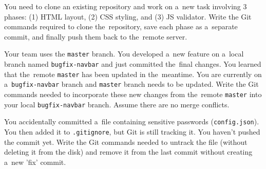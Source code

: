 \documentclass[11pt,a4paper,addpoints]{exam}
\begin{document}
\cellwidth{2.75cm}
\noindent \gradetable[h]

\vspace{0.8cm}

\begin{questions}

\question[2] 
You need to clone an existing repository and work on a~new task involving 3 phases: (1) HTML layout, (2) CSS styling, and (3) JS validator. Write the Git commands required to clone the~repository, save each phase as a~separate commit, and finally push them back to the~remote server.
\fillwithdottedlines{6cm}

\question[2] 
Your team uses the \texttt{master} branch. You developed a~new feature on a~local branch named \texttt{bugfix-navbar} and just committed the~final changes. You learned that the~remote \texttt{master} has been updated in the~meantime. You are currently on a~\texttt{bugfix-navbar} branch and \texttt{master} branch needs to be updated. Write the Git commands needed to incorporate these new changes from the~remote \texttt{master} into your local \texttt{bugfix-navbar} branch. Assume there are no merge conflicts.
\fillwithdottedlines{6cm}

\newpage

\question[1] 
You accidentally committed a~file containing sensitive passwords (\texttt{config.json}). You then added it to \texttt{.gitignore}, but Git is still tracking it. You haven't pushed the commit yet. Write the Git commands needed to untrack the file (without deleting it from the disk) and remove it from the last commit without creating a~new 'fix' commit.
\fillwithdottedlines{6cm}

\end{questions}
\end{document}
